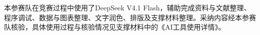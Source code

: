本参赛队在竞赛过程中使用了DeepSeek V4.1 Flash，辅助完成资料与文献整理、程序调试、数据与图表整理、文字润色、排版及支撑材料整理。采纳内容经本参赛队核验，具体使用过程与核验情况见支撑材料中的《AI工具使用详情》。
